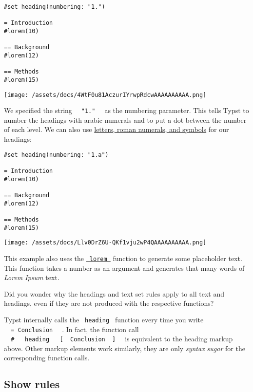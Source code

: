 \begin{verbatim}
#set heading(numbering: "1.")

= Introduction
#lorem(10)

== Background
#lorem(12)

== Methods
#lorem(15)
\end{verbatim}

\texttt{[image: /assets/docs/4WtF0u81AczurIYrwpRdcwAAAAAAAAAA.png]}

We specified the string \texttt{\ }{\texttt{\ "1."\ }}\texttt{\ } as the
numbering parameter. This tells Typst to number the headings with arabic
numerals and to put a dot between the number of each level. We can also
use \href{/docs/reference/model/numbering/}{letters, roman numerals, and
symbols} for our headings:

\begin{verbatim}
#set heading(numbering: "1.a")

= Introduction
#lorem(10)

== Background
#lorem(12)

== Methods
#lorem(15)
\end{verbatim}

\texttt{[image: /assets/docs/Llv0DrZ6U-QKf1vju2wP4QAAAAAAAAAA.png]}

This example also uses the
\href{/docs/reference/text/lorem/}{\texttt{\ lorem\ }} function to
generate some placeholder text. This function takes a number as an
argument and generates that many words of \emph{Lorem Ipsum} text.

Did you wonder why the headings and text set rules apply to all text and
headings, even if they are not produced with the respective functions?

Typst internally calls the \texttt{\ heading\ } function every time you
write \texttt{\ }{\texttt{\ =\ Conclusion\ }}\texttt{\ } . In fact, the
function call
\texttt{\ }{\texttt{\ \#\ }}\texttt{\ }{\texttt{\ heading\ }}\texttt{\ }{\texttt{\ {[}\ }}\texttt{\ Conclusion\ }{\texttt{\ {]}\ }}\texttt{\ }
is equivalent to the heading markup above. Other markup elements work
similarly, they are only \emph{syntax sugar} for the corresponding
function calls.

\subsection{Show rules}\label{show-rules}

